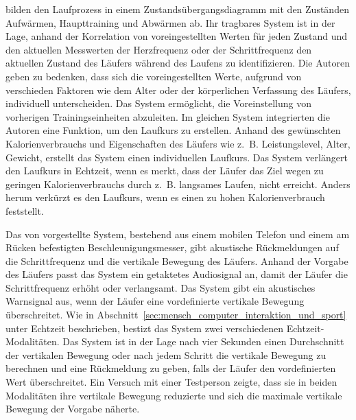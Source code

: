 \citet[][]{Takata2007} bilden den Laufprozess in einem Zustandsübergangsdiagramm mit den Zuständen Aufwärmen, Haupttraining und Abwärmen ab. Ihr tragbares System ist in der Lage, anhand der Korrelation von voreingestellten Werten für jeden Zustand und den aktuellen Messwerten der Herzfrequenz oder der Schrittfrequenz den aktuellen Zustand des Läufers während des Laufens zu identifizieren. Die Autoren geben zu bedenken, dass sich die voreingestellten Werte, aufgrund von verschieden Faktoren wie dem Alter oder der körperlichen Verfassung des Läufers, individuell unterscheiden. Das System ermöglicht, die Voreinstellung von vorherigen Trainingseinheiten abzuleiten. Im gleichen System integrierten die Autoren eine Funktion, um den Laufkurs zu erstellen. Anhand des gewünschten Kalorienverbrauchs und Eigenschaften des Läufers wie z.~B. Leistungslevel, Alter, Gewicht, erstellt das System einen individuellen Laufkurs. Das System verlängert den Laufkurs in Echtzeit, wenn es merkt, dass der Läufer das Ziel wegen zu geringen Kalorienverbrauchs durch z.~B. langsames Laufen, nicht erreicht. Anders herum verkürzt es den Laufkurs, wenn es einen zu hohen Kalorienverbrauch feststellt.

Das von \citet[][]{Eriksson2010} vorgestellte System, bestehend aus einem mobilen Telefon und einem am Rücken befestigten Beschleunigungsmesser, gibt akustische Rückmeldungen auf die Schrittfrequenz und die vertikale Bewegung des Läufers. Anhand der Vorgabe des Läufers passt das System ein getaktetes Audiosignal an, damit der Läufer die Schrittfrequenz erhöht oder verlangsamt. Das System gibt ein akustisches Warnsignal aus, wenn der Läufer eine vordefinierte vertikale Bewegung überschreitet. Wie in Abschnitt~\ref{sec:mensch_computer_interaktion_und_sport} unter Echtzeit beschrieben, bestizt das System zwei verschiedenen Echtzeit-Modalitäten. Das System ist in der Lage nach vier Sekunden einen Durchschnitt der vertikalen Bewegung oder nach jedem Schritt die vertikale Bewegung zu berechnen und eine Rückmeldung zu geben, falls der Läufer den vordefinierten Wert überschreitet. Ein Versuch mit einer Testperson zeigte, dass sie in beiden Modalitäten ihre vertikale Bewegung reduzierte und sich die maximale vertikale Bewegung der Vorgabe näherte.

